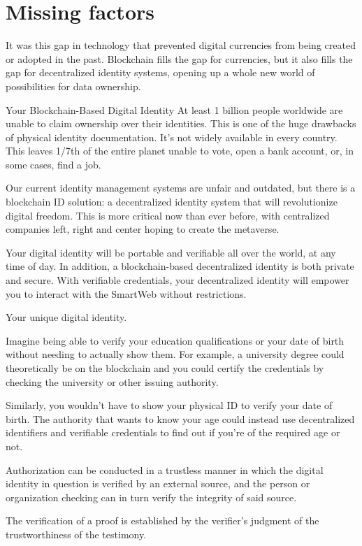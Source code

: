 \section{Missing factors}
It was this gap in technology that prevented digital currencies from being created or adopted in the past. Blockchain fills the gap for currencies, but it also fills the gap for decentralized identity systems, opening up a whole new world of possibilities for data ownership.

Your Blockchain-Based Digital Identity
At least 1 billion people worldwide are unable to claim ownership over their identities. This is one of the huge drawbacks of physical identity documentation. It's not widely available in every country. This leaves 1/7th of the entire planet unable to vote, open a bank account, or, in some cases, find a job. 

Our current identity management systems are unfair and outdated, but there is a blockchain ID solution: a decentralized identity system that will revolutionize digital freedom. This is more critical now than ever before, with centralized companies left, right and center hoping to create the metaverse.

Your digital identity will be portable and verifiable all over the world, at any time of day. In addition, a blockchain-based decentralized identity is both private and secure. With verifiable credentials, your decentralized identity will empower you to interact with the SmartWeb without restrictions.

Your unique digital identity.

Imagine being able to verify your education qualifications or your date of birth without needing to actually show them. For example, a university degree could theoretically be on the blockchain and you could certify the credentials by checking the university or other issuing authority. 

Similarly, you wouldn't have to show your physical ID to verify your date of birth. The authority that wants to know your age could instead use decentralized identifiers and verifiable credentials to find out if you're of the required age or not.

Authorization can be conducted in a trustless manner in which the digital identity in question is verified by an external source, and the person or organization checking can in turn verify the integrity of said source. 

The verification of a proof is established by the verifier's judgment of the trustworthiness of the testimony.

